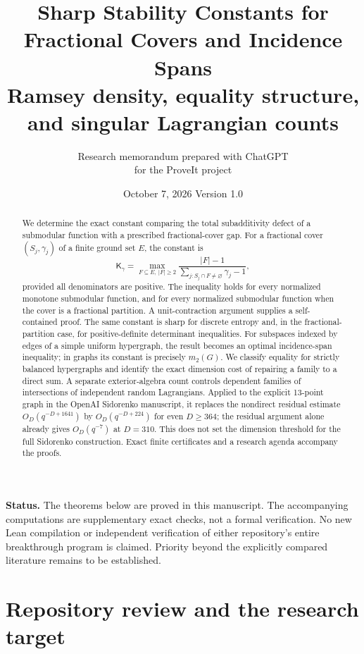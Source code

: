 \documentclass[11pt]{article}
\title{\bfseries Sharp Stability Constants for Fractional Covers
and Incidence Spans\\[5pt]
\large Ramsey density, equality structure, and singular Lagrangian counts}
\author{Research memorandum prepared with ChatGPT\\for the ProveIt project}
\date{October 7, 2026 \quad\textperiodcentered\quad Version 1.0}
\theoremstyle{definition}
\theoremstyle{remark}
\newcommand{\1}{\mathbf 1}
\newcommand{\Kopt}{\mathsf K}
\begin{document}
\maketitle
\begin{abstract}
We determine the exact constant comparing the total subadditivity defect of a
submodular function with a prescribed fractional-cover gap. For a fractional
cover $(S_j,\gamma_j)$ of a finite ground set $E$, the constant is
\[
 \Kopt_\gamma=\max_{F\subseteq E,\ |F|\ge2}
 \frac{|F|-1}{\sum_{j:S_j\cap F\ne\varnothing}\gamma_j-1},
\]
provided all denominators are positive. The inequality holds for every normalized
monotone submodular function, and for every normalized submodular function when
the cover is a fractional partition. A unit-contraction argument supplies a
self-contained proof. The same constant is sharp for discrete entropy and, in
the fractional-partition case, for positive-definite determinant inequalities.
For subspaces indexed by edges of a simple uniform hypergraph, the result becomes
an optimal incidence-span inequality; in graphs its constant is precisely
$m_2(G)$. We classify equality for strictly balanced hypergraphs and identify the
exact dimension cost of repairing a family to a direct sum.
A separate exterior-algebra count controls dependent families of intersections
of independent random Lagrangians. Applied to the explicit 13-point graph in the
OpenAI Sidorenko manuscript, it replaces the nondirect residual estimate
$O_D(q^{-D+1641})$ by $O_D(q^{-D+224})$ for even $D\ge364$; the residual argument
alone already gives $O_D(q^{-7})$ at $D=310$. This does not set the dimension
threshold for the full Sidorenko construction. Exact finite certificates and a
research agenda accompany the proofs.
\end{abstract}

\vspace{4pt}
\noindent\textbf{Status.} The theorems below are proved in this manuscript.
The accompanying computations are supplementary exact checks, not a formal
verification. No new Lean compilation or independent verification of either
repository's entire breakthrough program is claimed. Priority beyond the
explicitly compared literature remains to be established.

\newpage
\begingroup
\fontsize{9.5}{11.3}\selectfont
\tableofcontents
\endgroup
\newpage

\section{Repository review and the research target}
\label{sec:review}
\end{document}
